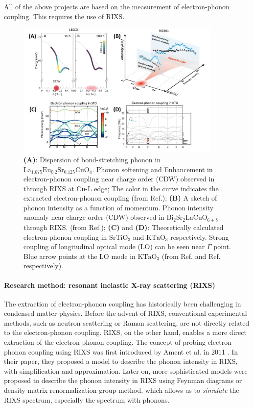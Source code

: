 \documentclass[11pt]{article}
\begin{document}
All of the above projects are based on the measurement of electron-phonon coupling. This requires the use of RIXS.
\begin{figure}[!t]
    \centering
    \includegraphics[width=0.9\textwidth]{figures/figure1.jpg}
    \caption{\textbf{(A)}: Dispersion of bond-stretching phonon in $\mathrm{La_{1.675}Eu_{0.2}Sr_{0.125}CuO_{4}}$. Phonon softening and Enhancement in electron-phonon coupling near charge order (CDW) observed in  through RIXS at Cu-L edge; The color in the curve indicates the extracted electron-phonon coupling (from Ref.\cite{wang_charge_2021}); \textbf{(B)} A sketch of phonon intensity as a function of momentum. Phonon intensity anomaly near charge order (CDW) observed in $\mathrm{Bi_2Sr_2LaCuO_{6+\delta}}$ through RIXS.  (from Ref.\cite{li_multiorbital_2020}); \textbf{(C)} and \textbf{(D)}: Theoretically calculated electron-phonon coupling in $\mathrm{SrTiO_3}$ and $\mathrm{KTaO_3}$ respectively. Strong coupling of longitudinal optical mode (LO) can be seen near $\Gamma$ point. Blue arrow points at the LO mode in  $\mathrm{KTaO_3}$ (from Ref.\cite{zhou_electron-phonon_2018} and Ref.\cite{esswein_first-principles_2023} respectively).}  
    \label{first_figure}
\end{figure}
\paragraph{Research method: resonant inelastic X-ray scattering (RIXS)}
The extraction of electron-phonon coupling has historically been challenging in condensed matter physics. Before the advent of RIXS, conventional experimental methods, such as neutron scattering or Raman scattering, are not directly related to the electron-phonon coupling. RIXS, on the other hand, enables a more direct extraction of the electron-phonon coupling. The concept of probing electron-phonon coupling using RIXS was first introduced by Ament et al. in 2011 \cite{ament_resonant_2011}. In their paper, they proposed a model to describe the phonon intensity in RIXS, with simplification and approximation. Later on, more sophisticated models were proposed to describe the phonon intensity in RIXS using Feynman diagrams \cite{devereaux_directly_2016,matsubayashi_numerical_2023} or density matrix renormalization group method\cite{nocera_computing_2018,bieniasz_theory_2022,geondzhian_generalization_2020}, which allows us to \textit{simulate}  the RIXS spectrum, especially the spectrum with phonons. 
\end{document}
